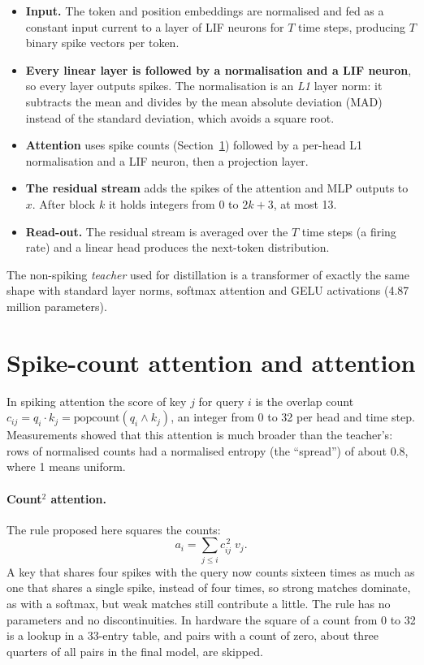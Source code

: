 \begin{itemize}
  \item \textbf{Input.} The token and position embeddings are normalised and fed as a constant input current to a
        layer of LIF neurons for $T$ time steps, producing $T$ binary spike vectors per token.
  \item \textbf{Every linear layer is followed by a normalisation and a LIF neuron}, so every layer outputs spikes.
        The normalisation is an \emph{L1} layer norm: it subtracts the mean and divides by the mean absolute
        deviation (MAD) instead of the standard deviation, which avoids a square root.
  \item \textbf{Attention} uses spike counts (Section~\ref{sec:csq}) followed by a per-head L1 normalisation and a
        LIF neuron, then a projection layer.
  \item \textbf{The residual stream} adds the spikes of the attention and MLP outputs to $x$. After block $k$ it
        holds integers from 0 to $2k+3$, at most 13.
  \item \textbf{Read-out.} The residual stream is averaged over the $T$ time steps (a firing rate) and a linear
        head produces the next-token distribution.
\end{itemize}

The non-spiking \emph{teacher} used for distillation is a transformer of exactly the same shape with standard layer
norms, softmax attention and GELU activations (4.87 million parameters).

\section{Spike-count attention and \csq{} attention}
\label{sec:csq}

In spiking attention the score of key $j$ for query $i$ is the overlap count
$c_{ij} = q_i \cdot k_j = \mathrm{popcount}(q_i \wedge k_j)$, an integer from 0 to 32 per head and time step.
Measurements showed that this attention is much broader than the teacher's: rows of normalised counts had a
normalised entropy (the ``spread'') of about 0.8, where 1 means uniform.

\paragraph{Count$^2$ attention.} The rule proposed here squares the counts:
\begin{equation}
  a_i = \sum_{j \le i} c_{ij}^{\,2}\; v_j .
\end{equation}
A key that shares four spikes with the query now counts sixteen times as much as one that shares a single spike,
instead of four times, so strong matches dominate, as with a softmax, but weak matches still contribute a little.
The rule has no parameters and no discontinuities. In hardware the square of a count from 0 to 32 is a lookup in a
33-entry table, and pairs with a count of zero, about three quarters of all pairs in the final model, are skipped.

